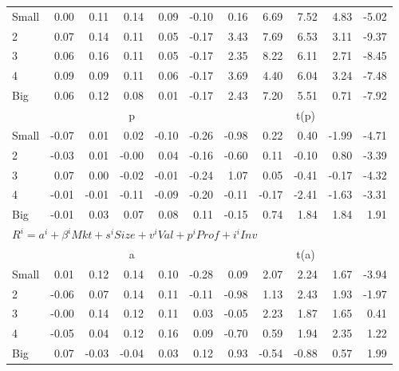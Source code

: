 \begin{table}[!ht]
\begin{tabular}{lrrrrrrrrrr}
    \\
      \cmidrule(r){2-6} \cmidrule(r){7-11}

    Small   & 0.00  & 0.11  & 0.14  & 0.09  & -0.10  & 0.16  & 6.69  & 7.52  & 4.83  & -5.02  \\
         2  & 0.07  & 0.14  & 0.11  & 0.05  & -0.17  & 3.43  & 7.69  & 6.53  & 3.11  & -9.37  \\
         3  & 0.06  & 0.16  & 0.11  & 0.05  & -0.17  & 2.35  & 8.22  & 6.11  & 2.71  & -8.45  \\
         4  & 0.09  & 0.09  & 0.11  & 0.06  & -0.17  & 3.69  & 4.40  & 6.04  & 3.24  & -7.48  \\
    Big     & 0.06  & 0.12  & 0.08  & 0.01  & -0.17  & 2.43  & 7.20  & 5.51  & 0.71  & -7.92  \\

  
    
      & \multicolumn{5}{c}{p} & \multicolumn{5}{c}{t(p)}
    
    \\
      \cmidrule(r){2-6} \cmidrule(r){7-11}

    Small   & -0.07  & 0.01  & 0.02  & -0.10  & -0.26  & -0.98  & 0.22  & 0.40  & -1.99  & -4.71  \\
         2  & -0.03  & 0.01  & -0.00  & 0.04  & -0.16  & -0.60  & 0.11  & -0.10  & 0.80  & -3.39  \\
         3  & 0.07  & 0.00  & -0.02  & -0.01  & -0.24  & 1.07  & 0.05  & -0.41  & -0.17  & -4.32  \\
         4  & -0.01  & -0.01  & -0.11  & -0.09  & -0.20  & -0.11  & -0.17  & -2.41  & -1.63  & -3.31  \\
    Big     & -0.01  & 0.03  & 0.07  & 0.08  & 0.11  & -0.15  & 0.74  & 1.84  & 1.84  & 1.91  \\

  \midrule
  \multicolumn{11}{l}{$R^i=a^i+\beta^iMkt+s^iSize+v^iVal+p^iProf+i^iInv$} \\

      & \multicolumn{5}{c}{a} & \multicolumn{5}{c}{t(a)}
    
    \\
      \cmidrule(r){2-6} \cmidrule(r){7-11}

    Small   & 0.01  & 0.12  & 0.14  & 0.10  & -0.28  & 0.09  & 2.07  & 2.24  & 1.67  & -3.94  \\
         2  & -0.06  & 0.07  & 0.14  & 0.11  & -0.11  & -0.98  & 1.13  & 2.43  & 1.93  & -1.97  \\
         3  & -0.00  & 0.14  & 0.12  & 0.11  & 0.03  & -0.05  & 2.23  & 1.87  & 1.65  & 0.41  \\
         4  & -0.05  & 0.04  & 0.12  & 0.16  & 0.09  & -0.70  & 0.59  & 1.94  & 2.35  & 1.22  \\
    Big     & 0.07  & -0.03  & -0.04  & 0.03  & 0.12  & 0.93  & -0.54  & -0.88  & 0.57  & 1.99  \\


\end{tabular}
\end{table}
